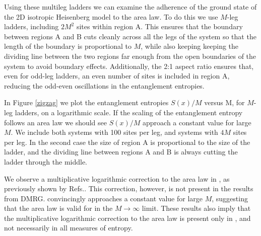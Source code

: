Using these multileg ladders we can examine the adherence of the ground state of the 2D isotropic Heisenberg model to the area law.
To do this we use $M$-leg ladders, including $2M^2$ sites within region A.  
This ensures that the boundary between regions A and B cuts cleanly across all the legs of the system so that the length of the boundary is proportional to $M$, while also keeping keeping the dividing line between the two regions far enough from the open boundaries of the system to avoid boundary effects.
Additionally, the 2:1 aspect ratio ensures that, even for odd-leg ladders, an even number of sites is included in region A, reducing the odd-even oscillations in the entanglement entropies.

In Figure \ref{zigzag} we plot the entanglement entropies $S(x)/M$ versus M, for $M$-leg ladders,  on a logarithmic scale.
If the scaling of the entanglement entropy follows an area law we should see $S(x)/M$ approach a constant value for large $M$.
We include both systems with 100 sites per leg, and systems with $4M$ sites per leg. 
In the second case the size of region A is proportional to the size of the ladder, and the dividing line between regions A and B is always cutting the ladder through the middle.

We observe a multiplicative logarithmic correction to the area law in \vB, as previously shown by Refs.\cite{Alet,Chh}.
This correction, however, is not present in the \vn results from DMRG.
\vn convincingly approaches a constant value for large $M$, suggesting that the area law is valid for \vn in the $M \rightarrow \infty$ limit. 
These results also imply that the multiplicative logarithmic correction to the area law is present only in \vB, and not necessarily in all measures of entropy.


 
